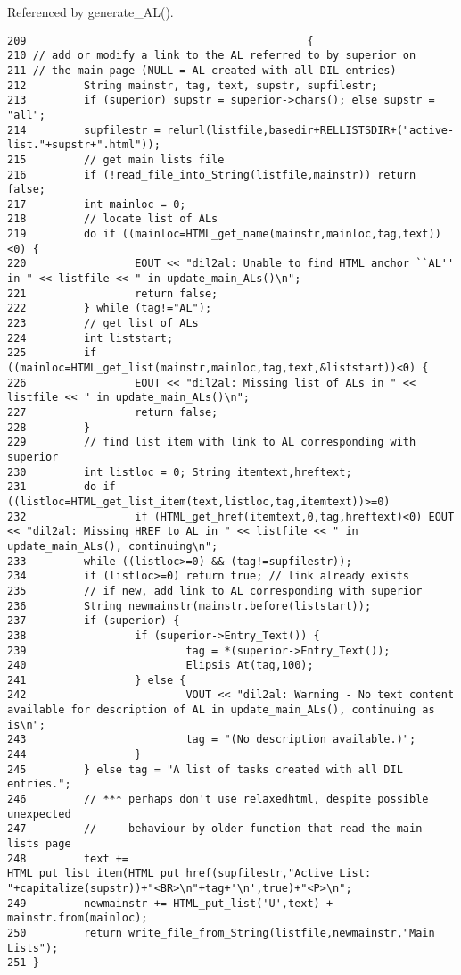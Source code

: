 Referenced by generate\_\-AL().



\footnotesize\begin{verbatim}209                                            {
210 // add or modify a link to the AL referred to by superior on
211 // the main page (NULL = AL created with all DIL entries)
212         String mainstr, tag, text, supstr, supfilestr;
213         if (superior) supstr = superior->chars(); else supstr = "all";
214         supfilestr = relurl(listfile,basedir+RELLISTSDIR+("active-list."+supstr+".html"));
215         // get main lists file
216         if (!read_file_into_String(listfile,mainstr)) return false;
217         int mainloc = 0;
218         // locate list of ALs
219         do if ((mainloc=HTML_get_name(mainstr,mainloc,tag,text))<0) {
220                 EOUT << "dil2al: Unable to find HTML anchor ``AL'' in " << listfile << " in update_main_ALs()\n";
221                 return false;
222         } while (tag!="AL");
223         // get list of ALs
224         int liststart;
225         if ((mainloc=HTML_get_list(mainstr,mainloc,tag,text,&liststart))<0) {
226                 EOUT << "dil2al: Missing list of ALs in " << listfile << " in update_main_ALs()\n";
227                 return false;
228         }
229         // find list item with link to AL corresponding with superior
230         int listloc = 0; String itemtext,hreftext;
231         do if ((listloc=HTML_get_list_item(text,listloc,tag,itemtext))>=0) 
232                 if (HTML_get_href(itemtext,0,tag,hreftext)<0) EOUT << "dil2al: Missing HREF to AL in " << listfile << " in update_main_ALs(), continuing\n";
233         while ((listloc>=0) && (tag!=supfilestr));
234         if (listloc>=0) return true; // link already exists
235         // if new, add link to AL corresponding with superior
236         String newmainstr(mainstr.before(liststart));
237         if (superior) {
238                 if (superior->Entry_Text()) {
239                         tag = *(superior->Entry_Text());
240                         Elipsis_At(tag,100);
241                 } else {
242                         VOUT << "dil2al: Warning - No text content available for description of AL in update_main_ALs(), continuing as is\n";
243                         tag = "(No description available.)";
244                 }
245         } else tag = "A list of tasks created with all DIL entries.";
246         // *** perhaps don't use relaxedhtml, despite possible unexpected
247         //     behaviour by older function that read the main lists page
248         text += HTML_put_list_item(HTML_put_href(supfilestr,"Active List: "+capitalize(supstr))+"<BR>\n"+tag+'\n',true)+"<P>\n";
249         newmainstr += HTML_put_list('U',text) + mainstr.from(mainloc);
250         return write_file_from_String(listfile,newmainstr,"Main Lists");
251 }
\end{verbatim}\normalsize 
{}
